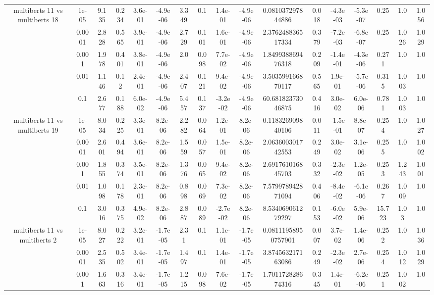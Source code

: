 \begin{tabular}{|c|c|c|c|c|c|c|c|c|c|c|c|c|c|c|c|c|}
\hline
\multirow{5}{*}{multiberts 11 vs multiberts 18} & 1e-05 & 9.135 & 0.234 & 3.6e-01 & -4.9e-06 & 3.349 & 0.1 & 1.4e-01 & -4.9e-06 & 0.081037297844886 & 0.018 & -4.3e-03 & -5.3e-07 & 0.25 & 1.0 & 1.056 \\
 & 0.0001 & 2.828 & 0.565 & 3.9e-01 & -4.9e-06 & 2.729 & 0.101 & 1.6e-01 & -4.9e-06 & 2.376248836517334 & 0.379 & -7.2e-03 & -6.8e-07 & 0.25 & 1.026 & 1.029 \\
 & 0.001 & 1.978 & 0.401 & 3.8e-01 & -4.9e-06 & 2.0 & 0.098 & 7.7e-02 & -4.9e-06 & 1.849938869476318 & 0.209 & -1.4e-01 & -4.3e-06 & 0.271 & 1.0 & 1.0 \\
 & 0.01 & 1.146 & 0.12 & 2.4e-01 & -4.9e-06 & 2.407 & 0.121 & 9.4e-02 & -4.9e-06 & 3.503599166870117 & 0.565 & 1.9e-01 & -5.7e-06 & 0.315 & 1.003 & 1.0 \\
 & 0.1 & 2.677 & 0.188 & 6.0e-02 & -4.9e-06 & 5.457 & 0.137 & -3.2e-02 & -4.9e-06 & 60.68182373046875 & 0.416 & 3.0e-02 & 6.0e-06 & 0.781 & 1.003 & 1.0 \\
\hline
\multirow{5}{*}{multiberts 11 vs multiberts 19} & 1e-05 & 8.034 & 0.225 & 3.3e-01 & 8.2e-06 & 2.282 & 0.064 & 1.2e-01 & 8.2e-06 & 0.118326909840106 & 0.011 & -1.5e-01 & 8.8e-07 & 0.254 & 1.0 & 1.027 \\
 & 0.0001 & 2.601 & 0.494 & 3.6e-01 & 8.2e-06 & 1.559 & 0.057 & 1.5e-01 & 8.2e-06 & 2.063600301742553 & 0.249 & 3.0e-02 & 3.1e-06 & 0.255 & 1.0 & 1.002 \\
 & 0.001 & 1.855 & 0.374 & 3.5e-01 & 8.2e-06 & 1.376 & 0.065 & 9.4e-02 & 8.2e-06 & 2.691761016845703 & 0.332 & -2.3e-02 & 1.2e-05 & 0.253 & 1.243 & 1.001 \\
 & 0.01 & 1.098 & 0.178 & 2.3e-01 & 8.2e-06 & 0.898 & 0.069 & 7.3e-02 & 8.2e-06 & 7.579978942871094 & 0.406 & -8.4e-02 & -6.1e-06 & 0.267 & 1.009 & 1.0 \\
 & 0.1 & 3.016 & 0.375 & 4.9e-02 & 8.2e-06 & 2.887 & 0.089 & -2.7e-02 & 8.2e-06 & 8.534069061279297 & 0.153 & -6.0e-02 & 5.9e-06 & 15.723 & 1.03 & 1.0 \\
\hline
\multirow{5}{*}{multiberts 11 vs multiberts 2} & 1e-05 & 8.027 & 0.222 & 3.2e-01 & -1.7e-05 & 2.31 & 0.1 & 1.1e-01 & -1.7e-05 & 0.08111958950757901 & 0.007 & 3.7e-02 & 1.4e-06 & 0.252 & 1.0 & 1.036 \\
 & 0.0001 & 2.535 & 0.502 & 3.4e-01 & -1.7e-05 & 1.497 & 0.1 & 1.4e-01 & -1.7e-05 & 3.874563217163086 & 0.249 & -2.3e-02 & 2.7e-06 & 0.254 & 1.012 & 1.029 \\
 & 0.001 & 1.663 & 0.316 & 3.4e-01 & -1.7e-05 & 1.215 & 0.098 & 7.6e-02 & -1.7e-05 & 1.701172828674316 & 0.345 & 1.4e-01 & -6.2e-06 & 0.251 & 1.002 & 1.0 \\

\end{tabular}
